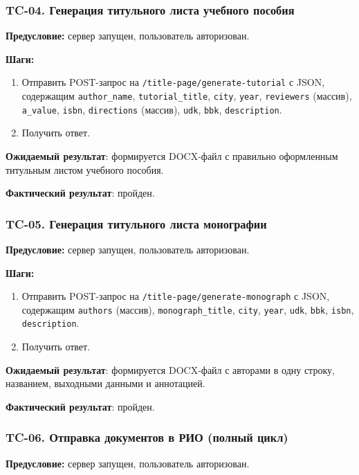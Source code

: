 \subsubsection{TC-04. Генерация титульного листа учебного пособия}

\textbf{Предусловие:} сервер запущен, пользователь авторизован.

\textbf{Шаги:}
\begin{enumerate}
	\item Отправить POST-запрос на \texttt{/title-page/generate-tutorial} с JSON, содержащим \texttt{author\_name}, \texttt{tutorial\_title}, \texttt{city}, \texttt{year}, \texttt{reviewers} (массив), \texttt{a\_value}, \texttt{isbn}, \texttt{directions} (массив), \texttt{udk}, \texttt{bbk}, \texttt{description}.
	\item Получить ответ.
\end{enumerate}

\textbf{Ожидаемый результат}: формируется DOCX-файл с правильно оформленным титульным листом учебного пособия.

\textbf{Фактический результат}: пройден.

\subsubsection{TC-05. Генерация титульного листа монографии}

\textbf{Предусловие:} сервер запущен, пользователь авторизован.

\textbf{Шаги:}
\begin{enumerate}
	\item Отправить POST-запрос на \texttt{/title-page/generate-monograph} с JSON, содержащим \texttt{authors} (массив), \texttt{monograph\_title}, \texttt{city}, \texttt{year}, \texttt{udk}, \texttt{bbk}, \texttt{isbn}, \texttt{description}.
	\item Получить ответ.
\end{enumerate}

\textbf{Ожидаемый результат}: формируется DOCX-файл с авторами в одну строку, названием, выходными данными и аннотацией.

\textbf{Фактический результат}: пройден.

\subsubsection{TC-06. Отправка документов в РИО (полный цикл)}

\textbf{Предусловие:} сервер запущен, пользователь авторизован.

